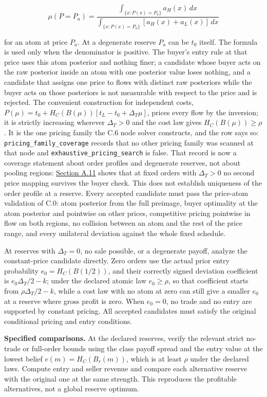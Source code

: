 \documentclass[
  11pt,
]{article}
\begin{document}
\[
\mu(P=P_a)=\frac{\int_{\{x:P(x)=P_a\}}a_H(x)\,dx}
{\int_{\{x:P(x)=P_a\}}[a_H(x)+a_L(x)]\,dx}
\tag{OA.79}\label{eq:oa-oa-79}
\]

for an atom at price \(P_a\). At a degenerate reserve \(P_a\) can be \(t_0\)
itself. The formula is used only when the denominator is positive.
The buyer's entry rule at that price uses this atom posterior and nothing finer; a
candidate whose buyer acts on the raw posterior inside an atom with one
posterior value loses nothing, and a candidate that assigns one price to flows
with distinct raw posteriors while the buyer acts on those posteriors is not
measurable with respect to the price and is rejected. The convenient
construction for independent costs,
\(P(\mu)=t_0+H_C(B(\mu))[t_L-t_0+\Delta_T\mu]\), prices every
flow by the inversion; it is strictly increasing wherever
\(\Delta_T>0\) and the cost law gives \(H_C(B(\mu))\ge\rho\).
It is the one pricing family the C.6 node solver
constructs, and the row says so: \texttt{pricing\_family\_coverage}
records that no other pricing family was scanned at that node and
\texttt{exhaustive\_pricing\_search} is false. That record is now a coverage
statement about order profiles and degenerate reserves, not about pooling
regions: \hyperref[oa-a-pools]{Section A.11} shows that at fixed orders with
\(\Delta_T>0\) no second price mapping survives the buyer check.
This does not establish uniqueness of the order profile at a reserve. Every
accepted candidate must pass the price-atom validation of C.0: atom
posterior from the full preimage, buyer optimality at the atom
posterior and pointwise on other prices, competitive pricing
pointwise in flow on both regions, no collision between an atom and the
rest of the price range, and every unilateral deviation against the whole
fixed schedule.

At reserves with \(\Delta_T=0\), no sale possible, or a degenerate
payoff, analyze the constant-price candidate directly. Zero orders use the
actual prior entry probability \(e_0=H_C(B(1/2))\), and their correctly
signed deviation coefficient is \(e_0\Delta_T/2-k\); under the declared
atomic law \(e_0\ge\rho\), so that coefficient starts from
\(\rho\Delta_T/2-k\), while a cost law with no atom at zero can still give a
smaller \(e_0\) at a reserve where gross profit is zero. When \(e_0=0\), no trade and no
entry are supported by constant pricing. All accepted candidates must
satisfy the original conditional pricing and entry conditions.

\textbf{Specified comparisons.} At the declared reserves, verify the
relevant strict no-trade or full-order bounds using the class payoff
spread and the entry value at the lowest belief \(e(m)=H_C(B_r(m))\),
which is at least \(\rho\) under the declared laws. Compute entry and
seller revenue and compare each alternative reserve with the original
one at the same strength. This reproduces the profitable alternatives,
not a global reserve optimum.
\end{document}
